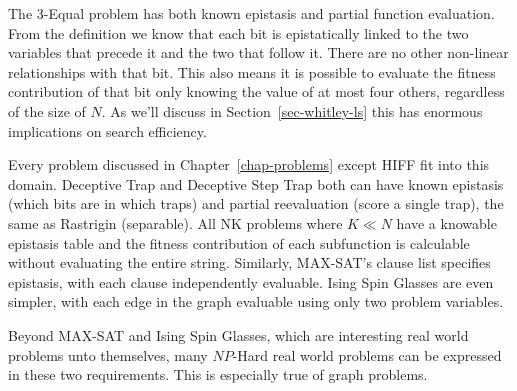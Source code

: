 The 3-Equal problem has both known epistasis and partial function evaluation. From the definition
we know that each bit is epistatically linked to the two variables that precede it and the two
that follow it. There are no other non-linear relationships with that bit. This also means
it is possible to evaluate the fitness contribution of that bit only knowing the value of at
most four others, regardless of the size of $N$. As we'll discuss in Section~\ref{sec-whitley-ls}
this has enormous implications on search efficiency.

Every problem discussed in Chapter~\ref{chap-problems} except HIFF fit into this domain. Deceptive
Trap and Deceptive Step Trap both can have known epistasis (which bits are in which traps) and
partial reevaluation (score a single trap), the same as Rastrigin (separable). All NK problems
where $K \ll N $ have a knowable epistasis table and the fitness contribution of each subfunction is
calculable without evaluating the entire string. Similarly, MAX-SAT's clause list specifies epistasis,
with each clause independently evaluable. Ising Spin Glasses are even simpler, with each edge in the
graph evaluable using only two problem variables.

Beyond MAX-SAT and Ising Spin Glasses, which are interesting real world problems unto themselves,
many $NP$-Hard real world problems can be expressed in these two requirements. This is especially true
of graph problems.

